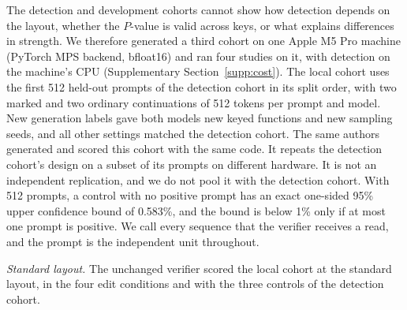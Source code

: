 \documentclass[10pt,twocolumn]{article}
\begin{document}
The detection and development cohorts cannot show how detection depends on the layout, whether the
$P$-value is valid across keys, or what explains differences in strength. We therefore generated a
third cohort on one Apple M5 Pro machine (PyTorch MPS backend, bfloat16) and ran four studies on it,
with detection on the machine's CPU (Supplementary Section~\ref{supp:cost}). The local cohort uses
the first 512 held-out prompts of the detection cohort in its split order, with two marked and two
ordinary continuations of 512 tokens per prompt and model. New generation labels gave both models
new keyed functions and new sampling seeds, and all other settings matched the detection cohort. The
same authors generated and scored this cohort with the same code. It repeats the detection cohort's
design on a subset of its prompts on different hardware. It is not an independent replication, and
we do not pool it with the detection cohort. With 512 prompts, a control with no positive prompt has
an exact one-sided 95\% upper confidence bound of 0.583\%, and the bound is below 1\% only if at most
one prompt is positive. We call every sequence that the verifier receives a read, and the prompt is
the independent unit throughout.

\textit{Standard layout.} The unchanged verifier scored the local cohort at the standard layout, in
the four edit conditions and with the three controls of the detection cohort.
\end{document}
